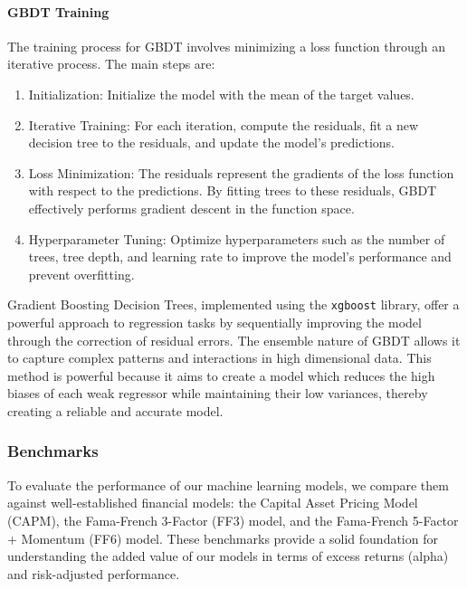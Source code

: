 \documentclass{article}
\begin{document}
    \paragraph{GBDT Training}

    The training process for GBDT involves minimizing a loss function through an iterative process. The main steps are:

    \begin{enumerate}[label={(\arabic*)}]
        \item {Initialization}: Initialize the model with the mean of the target values.

        \item {Iterative Training}: For each iteration, compute the residuals, fit a new decision tree to the residuals, and update the model's predictions.
        
        \item {Loss Minimization}: The residuals represent the gradients of the loss function with respect to the predictions. By fitting trees to these residuals, GBDT effectively performs gradient descent in the function space.

        \item {Hyperparameter Tuning}: Optimize hyperparameters such as the number of trees, tree depth, and learning rate to improve the model's performance and prevent overfitting.
    \end{enumerate}

    Gradient Boosting Decision Trees, implemented using the \texttt{xgboost} library, offer a powerful approach to regression tasks by sequentially improving the model through the correction of residual errors. The ensemble nature of GBDT allows it to capture complex patterns and interactions in high dimensional data. This method is powerful because it aims to create a model which reduces the high biases of each weak regressor while maintaining their low variances, thereby creating a reliable and accurate model. 

\subsubsection{Benchmarks}

To evaluate the performance of our machine learning models, we compare them against well-established financial models: the Capital Asset Pricing Model (CAPM), the Fama-French 3-Factor (FF3) model, and the Fama-French 5-Factor + Momentum (FF6) model. These benchmarks provide a solid foundation for understanding the added value of our models in terms of excess returns (alpha) and risk-adjusted performance.
\end{document}
